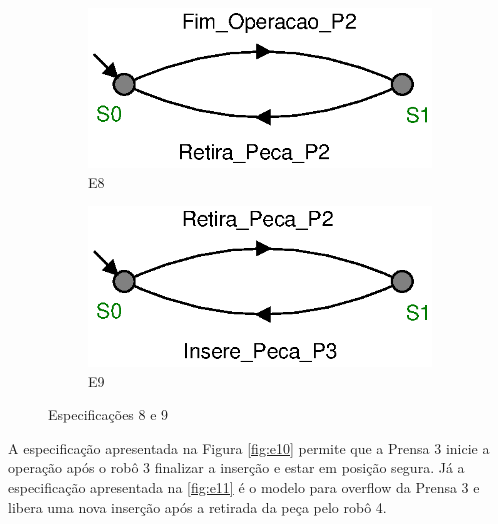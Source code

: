 \begin{figure}[H]%
  \centering
  \begin{subfigure}{0.45\textwidth}
      \centering
      \includegraphics[width=\textwidth]{imagens/E8.eps}
      \caption{E8}
      \label{fig:e8}
  \end{subfigure}
  \hfill
  \begin{subfigure}{0.45\textwidth}
      \centering
      \includegraphics[width=\textwidth]{imagens/E9.eps}
      \caption{E9}
      \label{fig:e9}
  \end{subfigure}
  \caption{Especificações 8 e 9}
  \label{fig:e89}
\end{figure}

A especificação apresentada na Figura \ref{fig:e10} permite que a Prensa 3 inicie a operação após o robô 3 finalizar a inserção e estar em posição segura.
Já a especificação apresentada na \ref{fig:e11} é o modelo para overflow da Prensa 3 e libera uma nova inserção após a retirada da peça pelo robô 4.

